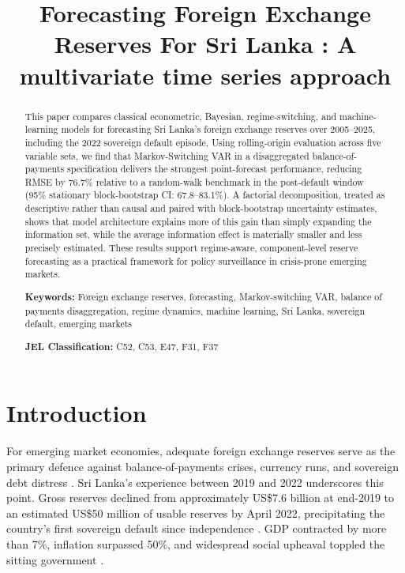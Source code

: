 \documentclass[12pt,a4paper]{article}
\title{Forecasting Foreign Exchange Reserves For Sri Lanka : A multivariate time series approach}
\author{}
\date{}
\begin{document}
\maketitle

\begin{abstract}
This paper compares classical econometric, Bayesian, regime-switching, and machine-learning models for forecasting Sri Lanka's foreign exchange reserves over 2005--2025, including the 2022 sovereign default episode. Using rolling-origin evaluation across five variable sets, we find that Markov-Switching VAR in a disaggregated balance-of-payments specification delivers the strongest point-forecast performance, reducing RMSE by 76.7\% relative to a random-walk benchmark in the post-default window (95\% stationary block-bootstrap CI: 67.8--83.1\%). A factorial decomposition, treated as descriptive rather than causal and paired with block-bootstrap uncertainty estimates, shows that model architecture explains more of this gain than simply expanding the information set, while the average information effect is materially smaller and less precisely estimated. These results support regime-aware, component-level reserve forecasting as a practical framework for policy surveillance in crisis-prone emerging markets.

\noindent\textbf{Keywords:} Foreign exchange reserves, forecasting, Markov-switching VAR, balance of payments disaggregation, regime dynamics, machine learning, Sri Lanka, sovereign default, emerging markets

\noindent\textbf{JEL Classification:} C52, C53, E47, F31, F37
\end{abstract}

\section{Introduction}

For emerging market economies, adequate foreign exchange reserves serve as the primary defence against balance-of-payments crises, currency runs, and sovereign debt distress \citep{JeanneRanciere2011}. Sri Lanka's experience between 2019 and 2022 underscores this point. Gross reserves declined from approximately US\$7.6 billion at end-2019 to an estimated US\$50 million of usable reserves by April 2022, precipitating the country's first sovereign default since independence \citep{Athukorala2024}. GDP contracted by more than 7\%, inflation surpassed 50\%, and widespread social upheaval toppled the sitting government \citep{Weerakoon2023}.
\end{document}
